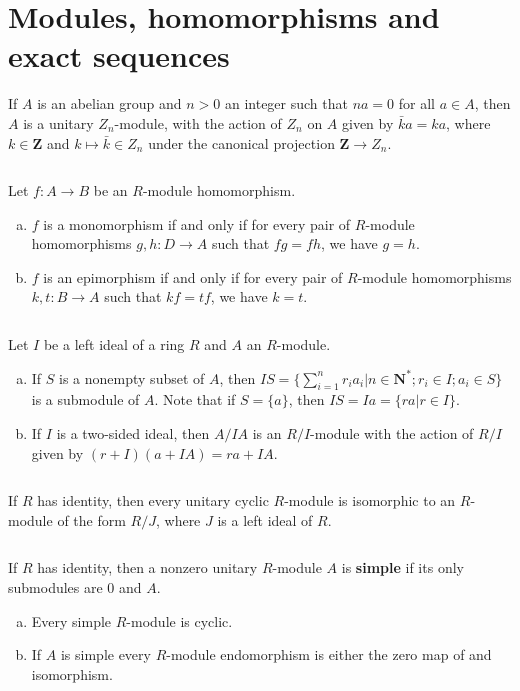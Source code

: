 \section{Modules, homomorphisms and exact sequences}
\begin{ex}
    If $A$ is an abelian group and $n>0$ an integer such that $na=0$ for all $a\in A$, then $A$ is a unitary $Z_{n}$-module, with the action of $Z_{n}$ on $A$ given by $\bar{k}a=ka$, where $k\in \mathbf{Z}$ and $k\mapsto \bar{k}\in Z_{n}$ under the canonical projection $\mathbf{Z}\to Z_{n}$.
\end{ex}

$$ $$

\begin{ex}
    Let $f:A\to B$ be an $R$-module homomorphism.
    \begin{enumerate}[(a)]
        \item $f$ is a monomorphism if and only if for every pair of $R$-module homomorphisms $g,h:D\to A$ such that $fg=fh$, we have $g=h$.
        \item $f$ is an epimorphism if and only if for every pair of $R$-module homomorphisms $k,t:B\to A$ such that $kf=tf$, we have $k=t$.
    \end{enumerate}
\end{ex}

$$ $$

\begin{ex}
    Let $I$ be a left ideal of a ring $R$ and $A$ an $R$-module.
    \begin{enumerate}[(a)]
        \item If $S$ is a nonempty subset of $A$, then $IS=\{\sum\limits_{i=1}^{n}r_{i}a_{i}|n\in \mathbf{N}^{*}; r_{i}\in I;a_{i}\in S\}$ is a submodule of $A$. Note that if $S=\{a\}$, then $IS=Ia=\{ra|r\in I\}$.
        \item If $I$ is a two-sided ideal, then $A /IA$ is an $R /I$-module with the action of $R /I$ given by $(r+I)(a+IA)=ra+IA$.
    \end{enumerate}
\end{ex}

$$ $$

\begin{ex}
    If $R$ has identity, then every unitary cyclic $R$-module is isomorphic to an $R$-module of the form $R /J$, where $J$ is a left ideal of $R$.
\end{ex}

$$ $$

\begin{ex}
    If $R$ has identity, then a nonzero unitary $R$-module $A$ is \textbf{simple} if its only submodules are 0 and $A$.
    \begin{enumerate}[(a)]
        \item Every simple $R$-module is cyclic.
        \item If $A$ is simple every $R$-module endomorphism is either the zero map of and isomorphism.
    \end{enumerate}
\end{ex}

